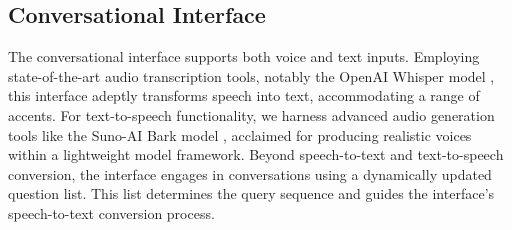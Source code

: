 
\subsection{Conversational Interface}

The conversational interface supports both voice and text inputs. Employing state-of-the-art audio transcription tools, notably the OpenAI Whisper model \cite{openai_whisper_2022}, this interface adeptly transforms speech into text, accommodating a range of accents. For text-to-speech functionality, we harness advanced audio generation tools like the Suno-AI Bark model \cite{bark}, acclaimed for producing realistic voices within a lightweight model framework. Beyond speech-to-text and text-to-speech conversion, the interface engages in conversations using a dynamically updated question list. This list determines the query sequence and guides the interface's speech-to-text conversion process.




